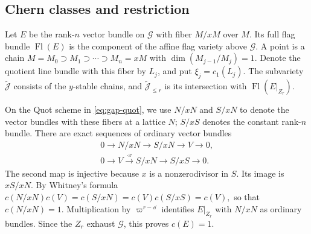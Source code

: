 \documentclass[a4paper,11pt,leqno]{amsart}
\newcommand{\tJ}{\widetilde{\mathcal J}}\newcommand{\DR}{DR_n}
\begin{document}
\subsection{Chern classes and restriction}
Let $E$ be the rank-$n$ vector bundle on $\mathcal G$ with fiber
$M/xM$ over $M$. Its full flag bundle $\operatorname{Fl}(E)$ is the component of the affine flag variety above $\mathcal G$. 
A point 
is a chain
$M=M_0\supset M_1\supset\cdots\supset M_n=xM$ with
$\dim(M_{j-1}/M_j)=1$. Denote the quotient line bundle with this
fiber by $L_j$, and put $\xi_j=c_1(L_j)$. The subvariety $\tJ$
consists of the $y$-stable chains, and $\tJ_{\le r}$ is its
intersection with $\operatorname{Fl}(E|_{Z_r})$.

On the Quot scheme in \eqref{eq:gap-quot}, we use $N/xN$ and $S/xN$
to denote the vector bundles with these fibers at a lattice $N$;
$S/xS$ denotes the constant rank-$n$ bundle. There are exact
sequences of ordinary vector bundles
\[
 \begin{gathered}
 0\longrightarrow N/xN\longrightarrow S/xN\longrightarrow V
       \longrightarrow0,\\
 0\longrightarrow V\xrightarrow{\cdot x}S/xN
       \longrightarrow S/xS\longrightarrow0.
 \end{gathered}
\]
The second map is 
injective because
$x$ is a nonzerodivisor in $S$. 
Its image is $xS/xN$. By Whitney's formula
$
 c(N/xN)c(V)=c(S/xN)=c(V)c(S/xS)=c(V),
$
so that$c(N/xN)=1$. Multiplication by
$\varpi^{r-\dd}$ identifies $E|_{Z_r}$ with $N/xN$ as ordinary
bundles. Since the $Z_r$ exhaust $\mathcal G$, this proves $c(E)=1$.
\end{document}
